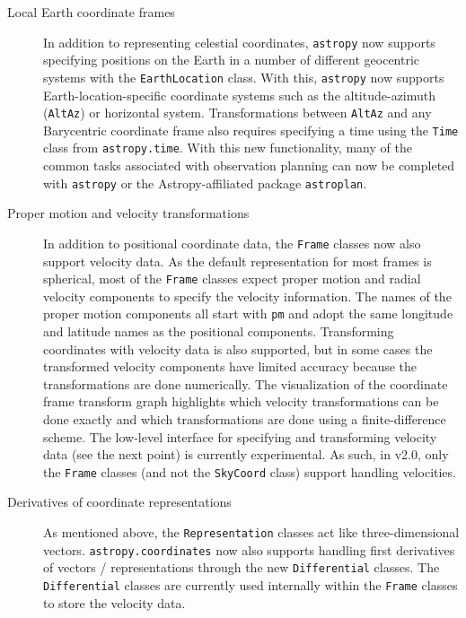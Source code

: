 \documentclass[modern]{aastex61}
\newcommand{\package}[1]{\texttt{#1}\xspace}
\newcommand{\astropy}{Astropy\xspace}
\newcommand{\astropypkg}{\package{astropy}}
\begin{document}
\begin{description}
    \item[Local Earth coordinate frames] In addition to representing celestial
    coordinates, \astropypkg now supports specifying positions on the Earth in
    a number of different geocentric systems with the \texttt{EarthLocation}
    class.
    With this, \astropypkg now supports Earth-location-specific coordinate
    systems such as the altitude-azimuth (\texttt{AltAz}) or horizontal system.
    Transformations between \texttt{AltAz} and any Barycentric coordinate frame
    also requires specifying a time using the \texttt{Time} class from
    \texttt{astropy.time}.
    With this new functionality, many of the common tasks associated with
    observation planning can now be completed with \astropypkg or the
    \astropy-affiliated package \package{astroplan}\citep{astroplan_AAS}.

    \item[Proper motion and velocity transformations]
    In addition to positional coordinate data, the \texttt{Frame} classes now
    also support velocity data.
    As the default representation for most frames is spherical, most of the
    \texttt{Frame} classes expect proper motion and radial velocity components
    to specify the velocity information.
    The names of the proper motion components all start with \texttt{pm} and
    adopt the same longitude and latitude names as the positional components.
    Transforming coordinates with velocity data is also supported, but in some
    cases the transformed velocity components have limited accuracy because the
    transformations are done numerically.
    The visualization of the coordinate frame transform graph highlights which
    velocity transformations can be done exactly and which transformations are
    done using a finite-difference scheme.
    The low-level interface for specifying and transforming velocity data (see
    the next point) is currently experimental.
    As such, in v2.0, only the \texttt{Frame} classes (and not the
    \texttt{SkyCoord} class) support handling velocities.

    \item[Derivatives of coordinate representations]
    As mentioned above, the \texttt{Representation} classes act like
    three-dimensional vectors.
    \texttt{astropy.coordinates} now also supports handling first derivatives of
    vectors / representations through the new \texttt{Differential} classes.
    The \texttt{Differential} classes are currently used internally within the
    \texttt{Frame} classes to store the velocity data.


\end{description}
\end{document}
